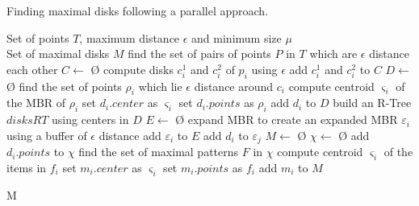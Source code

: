 \documentclass[12pt]{scrartcl}
\begin{document}
\begin{algorithm}
  \footnotesize
  \caption{Finding maximal disks following a parallel approach.}
  \label{alg:maximals}
  \begin{algorithmic}
    \REQUIRE 
    Set of points $T$, maximum distance $\epsilon$ and minimum size $\mu$ \\

    \ENSURE 
    Set of maximal disks $M$ 
    \vspace{3mm}
    \STATE find the set of pairs of points $P$ in $T$ which are $\epsilon$ distance each other
    \STATE $C \leftarrow$ \O{}
      \STATE compute disks $c_i^1$ and $c_i^2$ of $p_i$ using $\epsilon$ 
      \STATE add $c_i^1$ and $c_i^2$ to $C$
    \ENDFOR
    \STATE $D \leftarrow$ \O{}
      \STATE find the set of points $\rho_i$ which lie $\epsilon$ distance around $c_i$ 
		\STATE compute centroid $\varsigma_i$ of the MBR of $\rho_i$ 
		\STATE set $d_i.center$ as $\varsigma_i$
		\STATE set $d_i.points$ as $\rho_i$
			\STATE add $d_i$ to $D$ %
		\ENDIF
      \ENDIF
    \ENDFOR
    \STATE build an R-Tree $disksRT$ using centers in $D$ 
    \STATE $E \leftarrow$ \O{}
		\STATE expand MBR to create an expanded MBR $\varepsilon_i$ using a buffer of $\epsilon$ distance
		\STATE add $\varepsilon_i$ to $E$
	\ENDFOR
				\STATE add $d_i$ to $\varepsilon_j$ 
			\ENDIF
		\ENDFOR
	\ENDFOR
    \STATE $M \leftarrow$ \O{}
		\STATE $\chi \leftarrow$ \O{}
			\STATE add $d_i.points$ to $\chi$
		\ENDFOR
		\STATE find the set of maximal patterns $F$ in $\chi$
			\STATE compute centroid $\varsigma_i$ of the items in $f_i$
				\STATE set $m_i.center$ as $\varsigma_i$
				\STATE set $m_i.points$ as $f_i$
				\STATE add $m_i$ to $M$
			\ENDIF
		\ENDFOR
	\ENDFOR
	
	\RETURN M
  \end{algorithmic}
\end{algorithm}
\end{document}
